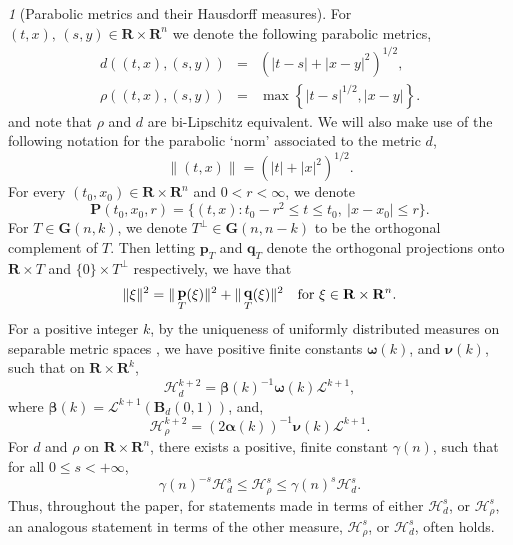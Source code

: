 \documentclass{article}
\theoremstyle{plain}
\theoremstyle{definition}
\theoremstyle{plain}
\theoremstyle{remark}
\newtheorem{propparagraph}[theorem]{}
\theoremstyle{remark}
\theoremstyle{plain}
\DeclareMathOperator{\bfp}{{\bf p}}
\DeclareMathOperator{\bfq}{{\bf q}}
\begin{document}
\begin{propparagraph}[Parabolic metrics and their Hausdorff measures]\label{para: parabolic metrics}
    For $(t, x), \, (s, y) \in \mathbf{R} \times \mathbf{R}^{n}$ we denote the following parabolic metrics, 
\begin{eqnarray*}
    d ((t, x), (s, y)) &=& \left( |t - s| + |x - y|^{2} \right)^{1 / 2}, \\ 
    \rho ((t, x), (s, y)) &=& \max \left\{ |t - s|^{1 / 2}, |x - y| \right\}.
\end{eqnarray*}
and note that $\rho$ and $d$ are bi-Lipschitz equivalent.
We will also make use of the following notation for the parabolic `norm' associated to the metric $d$, 
\begin{equation*}
    \| (t, x) \| = \left( |t| + |x|^{2} \right)^{1 / 2}.
\end{equation*}
For every $(t_0,x_0) \in \mathbf R \times \mathbf R^n$ and $0<r<\infty$, we denote 
\begin{equation*}
    \mathbf P(t_0,x_0,r) = \{(t,x) : t_0-r^2 \leq t \leq t_0, \ |x-x_0|\leq r \}.
\end{equation*}
For $T \in \mathbf{G} (n, k)$, we denote $T^{\perp} \in \mathbf{G}(n, n - k)$ to be the orthogonal complement of $T$. 
Then letting $\mathbf{p}_{T}$ and $\mathbf{q}_{T}$ denote the orthogonal projections onto $\mathbf{R} \times T$ and $\{0\} \times T^{\perp}$ respectively, we have that
\[ \|\xi\|^2 = \| \bfp_{T} (\xi)\|^2 + \|\bfq_{T}(\xi)\|^2 \quad \text{for $\xi \in \mathbf R \times \mathbf R^n$}.\]
For  a positive integer $k$, by the uniqueness of uniformly distributed measures on separable metric spaces \cite[3.4]{Mattila-RectifiabilityBook}, we have positive finite constants $\boldsymbol{\omega} (k)$, and $\boldsymbol{\nu} (k)$, such that on $\mathbf{R} \times \mathbf{R}^{k}$,
\begin{equation*}
    \mathscr{H}_{d}^{k + 2} = \boldsymbol{\beta} (k)^{-1} \boldsymbol{\omega} (k) \mathscr{L}^{k + 1},
\end{equation*}
where $\boldsymbol{\beta} (k) = \mathscr{L}^{k + 1} (\mathbf{B}_{d} (0, 1))$, and, 
\begin{equation*}
    \mathscr{H}_{\rho}^{k + 2} = (2 \boldsymbol{\alpha} (k))^{-1}\boldsymbol{\nu} (k) \mathscr{L}^{k + 1}.
\end{equation*}
For $d$ and $\rho$ on $\mathbf{R} \times \mathbf{R}^{n}$, there exists a positive, finite constant $\gamma (n)$, such that for all $0 \leq s < + \infty$, 
\begin{equation*}
    \gamma (n)^{-s} \mathscr{H}_{d}^{s} \leq \mathscr{H}_{\rho}^{s} \leq \gamma (n)^{s} \mathscr{H}_{d}^{s}.
\end{equation*}
Thus, throughout the paper, for statements made in terms of either $\mathscr{H}_{d}^{s}$, or $\mathscr{H}_{\rho}^{s}$, an analogous statement in terms of the other measure, $\mathscr{H}_{\rho}^{s}$, or $\mathscr{H}_{d}^{s}$, often holds.
\end{propparagraph}
\end{document}
